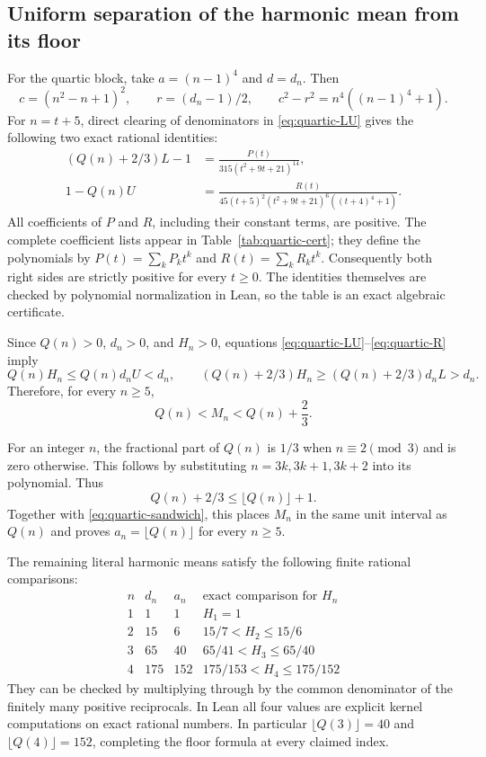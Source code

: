 \documentclass[11pt]{article}
\begin{document}
\subsection{Uniform separation of the harmonic mean from its floor}

For the quartic block, take $a=(n-1)^4$ and $d=d_n$. Then
\[
 c=(n^2-n+1)^2,\qquad r=(d_n-1)/2,\qquad
 c^2-r^2=n^4((n-1)^4+1).
\]
For $n=t+5$, direct clearing of denominators in \eqref{eq:quartic-LU}
gives the following two exact rational identities:
\begin{align}
 (Q(n)+2/3)L-1
 &=\frac{P(t)}{315(t^2+9t+21)^{14}},\label{eq:quartic-P}\\
 1-Q(n)U
 &=\frac{R(t)}{45(t+5)^2(t^2+9t+21)^6((t+4)^4+1)}.
 \label{eq:quartic-R}
\end{align}
All coefficients of $P$ and $R$, including their constant terms, are
positive. The complete coefficient lists appear in Table~\ref{tab:quartic-cert};
they define the polynomials by $P(t)=\sum_kP_kt^k$ and
$R(t)=\sum_kR_kt^k$. Consequently both right sides are strictly positive
for every $t\ge0$. The identities themselves are checked by polynomial
normalization in Lean, so the table is an exact algebraic certificate.

Since $Q(n)>0$, $d_n>0$, and $H_n>0$, equations
\eqref{eq:quartic-LU}--\eqref{eq:quartic-R} imply
\[
 Q(n)H_n\le Q(n)d_nU<d_n,
 \qquad
 (Q(n)+2/3)H_n\ge (Q(n)+2/3)d_nL>d_n.
\]
Therefore, for every $n\ge5$,
\begin{equation}\label{eq:quartic-sandwich}
 Q(n)<M_n<Q(n)+\frac23.
\end{equation}

For an integer $n$, the fractional part of $Q(n)$ is $1/3$ when
$n\equiv2\pmod3$ and is zero otherwise. This follows by substituting
$n=3k,3k+1,3k+2$ into its polynomial. Thus
\[
 Q(n)+2/3\le\lfloor Q(n)\rfloor+1.
\]
Together with \eqref{eq:quartic-sandwich}, this places $M_n$ in the
same unit interval as $Q(n)$ and proves $a_n=\lfloor Q(n)\rfloor$
for every $n\ge5$.

The remaining literal harmonic means satisfy the following finite rational
comparisons:
\[
\begin{array}{c|r|r|c}
n&d_n&a_n&\text{exact comparison for }H_n\\\hline
1&1&1&H_1=1\\
2&15&6&15/7<H_2\le15/6\\
3&65&40&65/41<H_3\le65/40\\
4&175&152&175/153<H_4\le175/152
\end{array}
\]
They can be checked by multiplying through by the common denominator
of the finitely many positive reciprocals. In Lean all four values
are explicit kernel computations on exact rational numbers. In particular
$\lfloor Q(3)\rfloor=40$ and $\lfloor Q(4)\rfloor=152$, completing
the floor formula at every claimed index.
\end{document}
